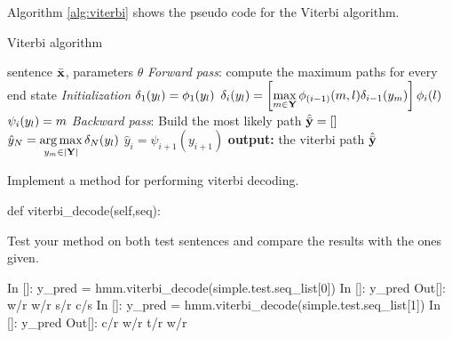 Algorithm \ref{alg:viterbi} shows the pseudo code for the Viterbi algorithm.
\begin{algorithm}[t]
   \caption{Viterbi algorithm \label{alg:viterbi}}
\begin{algorithmic}[1]
    sentence $\bar{\mathbf{x}}$, parameters $\theta$
        \STATE  \emph{Forward pass}: compute the maximum paths for
        every end state
        \STATE \emph{Initialization}
        \STATE $\delta_1({y}_l) = \phi_1({y}_l)$
        \ENDFOR 
                 \STATE $\delta_i({y}_l) = \left[ \displaystyle
                   \max_{m  \in \mathbf{Y}} \phi_{(i-1)}(m,l)
                   \delta_{i-1}({y}_m) \right] \phi_i(l)$
                 \STATE $\psi_{i}({y}_l) = m$
         \ENDFOR 
        \ENDFOR 
       \STATE \emph{Backward pass}: Build the most likely path
       \STATE $\hat {\bar{\mathbf{y}}} = []$ 
       \STATE $\hat y_N = \displaystyle \operatorname*{arg\,max}_{{y}_m  \in
                   |\mathbf{Y} |}  \delta_N({y}_l)$
        \STATE $\hat  y_i = \psi_{i+1}(y_{i+1})$
        \ENDFOR 
       \STATE \textbf{output:} the viterbi path $\hat {\bar{\mathbf{y}}}$
\end{algorithmic}
\end{algorithm}


\begin{exercise}
Implement a method for performing viterbi decoding.
\begin{python}
        def viterbi_decode(self,seq):
\end{python}

Test your method on both test sentences and compare the results with
the ones given.
\begin{python}
In []: y_pred = hmm.viterbi_decode(simple.test.seq_list[0])
In []: y_pred
Out[]: w/r w/r s/r c/s 
In []: y_pred = hmm.viterbi_decode(simple.test.seq_list[1])
In []: y_pred
Out[]: c/r w/r t/r w/r 
\end{python}
\end{exercise}




